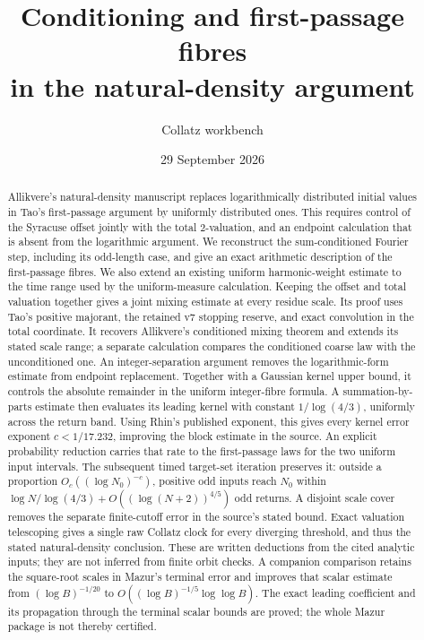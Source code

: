 \documentclass[11pt]{article}
\title{Conditioning and first-passage fibres\\in the natural-density argument}
\author{Collatz workbench}
\date{29 September 2026}
\theoremstyle{remark}\newtheorem{remark}[proposition]{Remark}
\begin{document}
\maketitle
\begin{abstract}
Allikvere's natural-density manuscript replaces logarithmically distributed
initial values in Tao's first-passage argument by uniformly distributed ones.
This requires control of the Syracuse offset jointly with the total
$2$-valuation, and an endpoint calculation that is absent from the
logarithmic argument. We reconstruct the sum-conditioned Fourier step,
including its odd-length case, and give an exact arithmetic description of
the first-passage fibres. We also extend an existing uniform harmonic-weight
estimate to the time range used by the uniform-measure calculation.
Keeping the offset and total valuation together gives a joint mixing
estimate at every residue scale. Its proof uses Tao's positive majorant,
the retained v7 stopping reserve, and exact convolution in the total
coordinate. It recovers Allikvere's conditioned mixing theorem and extends
its stated scale range; a separate calculation compares the conditioned
coarse law with the unconditioned one.
An integer-separation argument removes the logarithmic-form estimate from
endpoint replacement. Together with a Gaussian kernel upper bound, it
controls the absolute remainder in the uniform integer-fibre formula.
A summation-by-parts estimate then evaluates its leading kernel with
constant $1/\log(4/3)$, uniformly across the return band. Using Rhin's
published exponent, this gives every kernel error exponent
$c<1/17.232$, improving the block estimate in the source.
An explicit probability reduction carries that rate to the first-passage
laws for the two uniform input intervals. The subsequent timed target-set
iteration preserves it: outside a proportion $O_c((\log N_0)^{-c})$,
positive odd inputs reach $N_0$ within
$\log N/\log(4/3)+O((\log(N+2))^{4/5})$ odd returns.
A disjoint scale cover removes the separate finite-cutoff error in the
source's stated bound. Exact valuation telescoping gives a single
raw Collatz clock for every diverging threshold, and thus the stated
natural-density conclusion. These are written deductions from the cited
analytic inputs; they are not inferred from finite orbit checks.
A companion comparison retains the square-root scales in Mazur's
terminal error and improves that scalar estimate from
$(\log B)^{-1/20}$ to $O((\log B)^{-1/5}\log\log B)$.
The exact leading coefficient and its propagation through the terminal
scalar bounds are proved; the whole Mazur package is not thereby certified.

\end{abstract}
\end{document}
